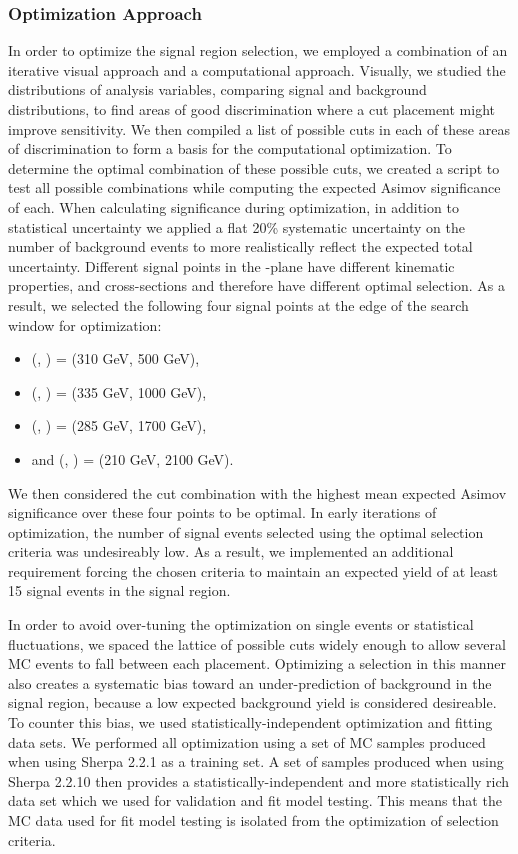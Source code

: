 \subsubsection{Optimization Approach}
In order to optimize the signal region selection, we employed a combination of an iterative visual approach and a computational approach. Visually, we studied the distributions of analysis variables, comparing signal and background distributions, to find areas of good discrimination where a cut placement might improve sensitivity. We then compiled a list of possible cuts in each of these areas of discrimination to form a basis for the computational optimization. To determine the optimal combination of these possible cuts, we created a script to test all possible combinations while computing the expected Asimov significance of each. When calculating significance during optimization, in addition to statistical uncertainty we applied a flat 20\% systematic uncertainty on the number of background events to more realistically reflect the expected total uncertainty. Different signal points in the \ms-\mZp plane have different kinematic properties, and cross-sections and therefore have different optimal selection. As a result, we selected the following four signal points at the edge of the search window for optimization:

\begin{itemize}
  \item (\ms, \mZp) = (310 GeV, 500 GeV),
  \item (\ms, \mZp) = (335 GeV, 1000 GeV),
  \item (\ms, \mZp) = (285 GeV, 1700 GeV),
  \item and (\ms, \mZp) = (210 GeV, 2100 GeV).
\end{itemize}

We then considered the cut combination with the highest mean expected Asimov significance over these four points to be optimal. In early iterations of optimization, the number of signal events selected using the optimal selection criteria was undesireably low. As a result, we implemented an additional requirement forcing the chosen criteria to maintain an expected yield of at least 15 signal events in the \merged signal region.

In order to avoid over-tuning the optimization on single events or statistical fluctuations, we spaced the lattice of possible cuts widely enough to allow several MC events to fall between each placement. Optimizing a selection in this manner also creates a systematic bias toward an under-prediction of background in the signal region, because a low expected background yield is considered desireable. To counter this bias, we used statistically-independent optimization and fitting data sets. We performed all optimization using a set of MC samples produced when using Sherpa 2.2.1 as a training set. A set of samples produced when using Sherpa 2.2.10 then provides a statistically-independent and more statistically rich data set which we used for validation and fit model testing. This means that the MC data used for fit model testing is isolated from the optimization of selection criteria.

